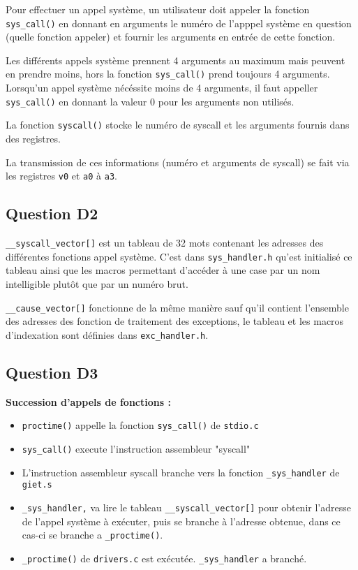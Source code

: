 \documentclass{article}
\begin{document}
Pour effectuer un appel système, un utilisateur doit appeler la fonction
\texttt{sys\_call()} en donnant en arguments le numéro de l'apppel système en
question (quelle fonction appeler) et fournir les arguments en entrée
de cette fonction.

Les différents appels système prennent 4 arguments au maximum mais peuvent
en prendre moins, hors la fonction \texttt{sys\_call()} prend toujours 4 arguments.
Lorsqu'un appel système nécéssite moins de 4 arguments, il faut appeller
\texttt{sys\_call()} en donnant la valeur 0 pour les arguments non utilisés.

La fonction \texttt{syscall()} stocke le numéro de syscall et les arguments fournis
dans des registres. 

La transmission de ces informations (numéro et arguments de syscall)
se fait via les registres \texttt{v0} et \texttt{a0} à \texttt{a3}.

\subsection{Question D2}

\texttt{\_\_syscall\_vector[]} est un tableau de 32 mots contenant les adresses
des différentes fonctions appel système. C'est dans \texttt{sys\_handler.h} 
qu'est initialisé ce tableau ainsi que les macros permettant d'accéder à une
case par un nom intelligible plutôt que par un numéro brut.

\texttt{\_\_cause\_vector[]} fonctionne de la même manière sauf qu'il contient
l'ensemble des adresses des fonction de traitement des exceptions,
le tableau et les macros d'indexation sont définies dans \texttt{exc\_handler.h}.

\subsection{Question D3}

\textbf{Succession d'appels de fonctions :}
\begin{itemize}
\item \texttt{proctime()} appelle la fonction \texttt{sys\_call()} de \texttt{stdio.c}
\item \texttt{sys\_call()} execute l'instruction assembleur "syscall"
\item L'instruction assembleur syscall branche vers la fonction \texttt{\_sys\_handler} de \texttt{giet.s}
\item \texttt{\_sys\_handler,} va lire le tableau \texttt{\_\_syscall\_vector[]} pour obtenir
	l'adresse de l'appel système à exécuter, puis se branche à l'adresse obtenue, dans ce cas-ci
	se branche a \texttt{\_proctime()}.
\item \texttt{\_proctime()} de \texttt{drivers.c} est exécutée.
\texttt{\_sys\_handler} a branché.
\end{itemize}
\end{document}
